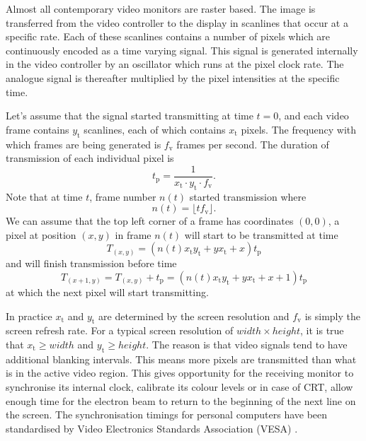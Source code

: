 \documentclass[a4paper,12pt,twoside,openright]{report}
\begin{document}
Almost all contemporary video monitors are raster based. The image is transferred from the video controller to the display in scanlines that occur at a specific rate. Each of these scanlines contains a number of pixels which are continuously encoded as a time varying signal. This signal is generated internally in the video controller by an oscillator which runs at the pixel clock rate. The analogue signal is thereafter multiplied by the pixel intensities at the specific time.

Let's assume that the signal started transmitting at time $t=0$, and each video frame contains $y_\text{t}$ scanlines, each of which contains $x_\text{t}$ pixels. The frequency with which frames are being generated is $f_\text{v}$ frames per second. The duration of transmission of each individual pixel is \begin{equation}
\label{eq:tdelta_definition}
t_\text{p}=\frac{1}{x_\text{t} \cdot y_\text{t} \cdot f_\text{v}} .
\end{equation}
Note that at time $t$, frame number $n(t)$ started transmission where 
\begin{equation}
n(t)=\lfloor t f_\text{v} \rfloor .
\end{equation}
We can assume that the top left corner of a frame has coordinates $(0, 0)$, a pixel at position $(x, y)$ in frame $n(t)$ will start to be transmitted at time
\begin{equation}
T_{(x,y)}= (n(t) x_\text{t} y_\text{t} + y x_\text{t} + x) t_\text{p}
\end{equation}
and will finish transmission before time 
\begin{equation}
T_{(x+1,y)} = T_{(x,y)} + t_\text{p} =(n(t) x_\text{t} y_\text{t} + y x_\text{t} + x + 1) t_\text{p}
\end{equation}
at which the next pixel will start transmitting.

In practice $x_\text{t}$ and $y_\text{t}$ are determined by the screen resolution and $f_\text{v}$ is simply the screen refresh rate. For a typical screen resolution of $width \times height$, it is true that $x_\text{t} \geq width$ and $y_\text{t} \geq height$. The reason is that video signals tend to have additional blanking intervals. This means more pixels are transmitted than what is in the active video region. This gives opportunity for the receiving monitor to synchronise its internal clock, calibrate its colour levels or in case of CRT, allow enough time for the electron beam to return to the beginning of the next line on the screen. The synchronisation timings for personal computers have been standardised by Video Electronics Standards Association (VESA) \cite{vesa}.
\end{document}
